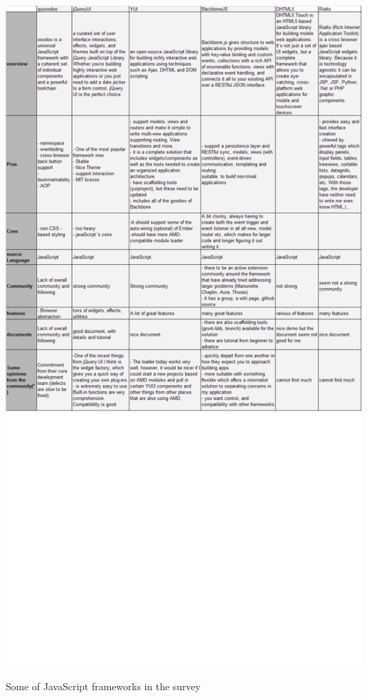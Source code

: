 \documentclass[14pt,a4paper]{extreport}
\begin{document}
			\begin{table}
				\begin{center}
					\includegraphics[scale=0.6]{JavaFrameTable3.png}
				
					\caption{Some of JavaScript frameworks in the survey}
				\end{center}
			
			\end{table}
\end{document}
